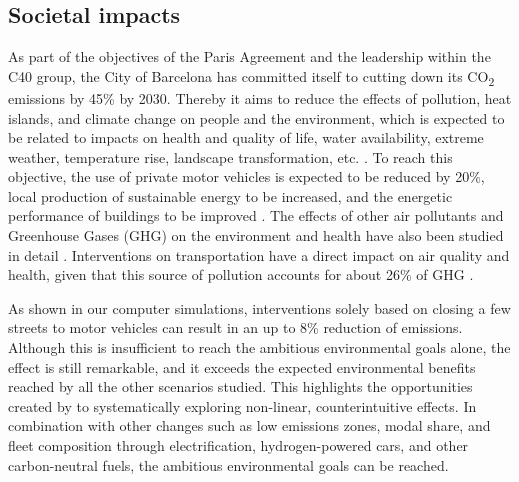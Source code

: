 \subsection{Societal impacts}
\label{subsec:LCBM_4.5_societal_impact}

As part of the objectives of the Paris Agreement and the leadership within the C40 group, the City of Barcelona has committed itself to cutting down its CO\textsubscript{2} emissions by 45\% by 2030. Thereby it aims to reduce the effects of pollution, heat islands, and climate change on people and the environment, which is expected to be related to impacts on health and quality of life, water availability, extreme weather, temperature rise, landscape transformation, etc. \citep{AjuntamentdeBarcelona2018}. To reach this objective, the use of private motor vehicles is expected to be reduced by 20\%, local production of sustainable energy to be increased, and the energetic performance of buildings to be improved \citep{AjuntamentdeBarcelona2020a}. The effects of other air pollutants and Greenhouse Gases (GHG) on the environment and health have also been studied in detail \citep{Benavides2021,Requia2018}. Interventions on transportation have a direct impact on air quality and health, given that this source of pollution accounts for about 26\% of GHG \citep{AgenciaLocaldEnergiadeBarcelona2022}.

As shown in our computer simulations, interventions solely based on closing a few streets to motor vehicles can result in an up to 8\% reduction of emissions. Although this is insufficient to reach the ambitious environmental goals alone, the effect is still remarkable, and it exceeds the expected environmental benefits reached by all the other scenarios studied. This highlights the opportunities created by to systematically exploring non-linear, counterintuitive effects. In combination with other changes such as low emissions zones, modal share, and fleet composition through electrification, hydrogen-powered cars, and other carbon-neutral fuels, the ambitious environmental goals can be reached.

